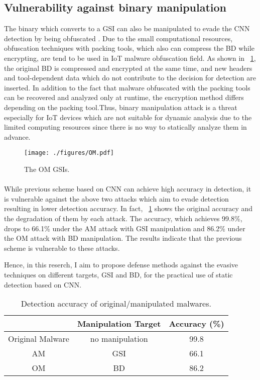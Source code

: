 \subsection{Vulnerability against binary manipulation}
The binary which converts to a GSI can also be manipulated to evade the CNN detection by being obfuscated \cite{om}.
Due to the small computational resources, obfuscation techniques with packing tools, which also can compress the BD while encrypting, are tend to be used in IoT malware obfuscation field.
As shown in \figurename~\ref{fig:omGSI}, the original BD is compressed and encrypted at the same time, and new headers and tool-dependent data which do not contribute to the decision for detection are inserted.
In addition to the fact that malware obfuscated with the packing tools can be recovered and analyzed only at runtime, the encryption method differs depending on the packing tool.Thus, binary manipulation attack is a threat especially for IoT devices which are not suitable for dynamic analysis due to the limited computing resources since there is no way to statically analyze them in advance.

\begin{figure}[h]
 \centering
 \texttt{[image: ./figures/OM.pdf]}
 \caption{The OM GSIs.} 
 \label{fig:omGSI}
\end{figure}
\newpage


\paragraph*{}
While previous scheme based on CNN can achieve high accuracy in detection, it is vulnerable against the above two attacks which aim to evade detection resulting in lower detection accuracy.
In fact, \tablename~\ref{tab:prev} shows the original accuracy and the degradation of them by each attack.
The accuracy, which achieves 99.8\%, drops to 66.1\% under the AM attack with GSI manipulation and 86.2\% under the OM attack with BD manipulation.
The results indicate that the previous scheme is vulnerable to these attacks.

Hence, in this reserch, I aim to propose defense methods against the evasive techniques on different targets, GSI and BD, for the practical use of static detection based on CNN.

\begin{table}[h]
  \begin{center}
    \caption{Detection accuracy of original/manipulated malwares.}
    \label{tab:prev} 
    \begin{tabular}{|c|c|c|} \hline
       & Manipulation Target & Accuracy (\%) \\ \hline \hline
      Original Malware & no manipulation  & 99.8  \\ \hline
      AM & GSI & 66.1  \\ \hline 
      OM & BD & 86.2 \\ \hline
    \end{tabular}
  \end{center}
\end{table} 
\newpage
